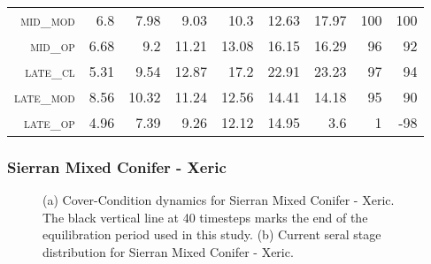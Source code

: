\begin{table}[!htbp]
\begin{tabular}{@{}rrrrrr|rrr@{}}
\footnotesize \textsc{mid\_mod  }        & \footnotesize  6.8         & \footnotesize 7.98    & \footnotesize 9.03      & \footnotesize 10.3    & \footnotesize 12.63     & \footnotesize 17.97    & \footnotesize 100   & \footnotesize 100     \\
\footnotesize \textsc{mid\_op   }        & \footnotesize  6.68        & \footnotesize 9.2     & \footnotesize 11.21     & \footnotesize 13.08   & \footnotesize 16.15     & \footnotesize 16.29    & \footnotesize 96    & \footnotesize 92     \\
\footnotesize \textsc{late\_cl  }        & \footnotesize  5.31        & \footnotesize 9.54    & \footnotesize 12.87     & \footnotesize 17.2    & \footnotesize 22.91     & \footnotesize 23.23    & \footnotesize 97    & \footnotesize 94      \\
\footnotesize \textsc{late\_mod }        & \footnotesize  8.56        & \footnotesize 10.32   & \footnotesize 11.24     & \footnotesize 12.56   & \footnotesize 14.41     & \footnotesize 14.18    & \footnotesize 95    & \footnotesize 90      \\
\footnotesize \textsc{late\_op  }        & \footnotesize  4.96        & \footnotesize 7.39    & \footnotesize 9.26      & \footnotesize 12.12   & \footnotesize 14.95     & \footnotesize 3.6      & \footnotesize 1     & \footnotesize -98      \\
  \hline
\end{tabular}
\end{table}

\subsubsection{Sierran Mixed Conifer - Xeric}


\begin{figure}[!htbp]
  \centering
  \caption{(a) Cover-Condition dynamics for Sierran Mixed Conifer - Xeric. The black vertical line at 40 timesteps marks the end of the equilibration period used in this study. (b) Current seral stage distribution for Sierran Mixed Conifer - Xeric.} 
  \label{fig:covcond_smcx}
\end{figure}

